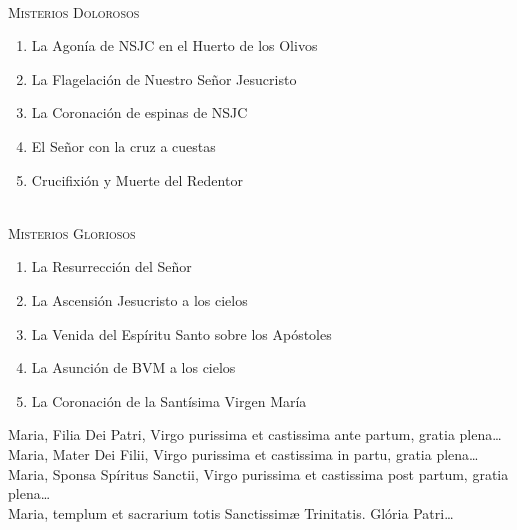 \documentclass[9pt]{article}
\begin{document}
\begin{multicols*}{2}
    \small{}\\
    \textsc{Misterios Dolorosos}
    \begin{enumerate}
        \item La Agonía de NSJC en el Huerto de los Olivos
        \item La Flagelación de Nuestro Señor Jesucristo
        \item La Coronación de espinas de NSJC
        \item El Señor con la cruz a cuestas
        \item Crucifixión y Muerte del Redentor
    \end{enumerate}

    \small{}\\
    \textsc{Misterios Gloriosos}
    \begin{enumerate}
        \item La Resurrección del Señor
        \item La Ascensión Jesucristo a los cielos
        \item La Venida del Espíritu Santo sobre los Apóstoles
        \item La Asunción de BVM a los cielos
        \item La Coronación de la Santísima Virgen María
    \end{enumerate}

    \bigskip

     Maria, Filia Dei Patri, Virgo purissima et castissima ante partum, gratia plena{\ldots}\\
     Maria, Mater Dei Filii, Virgo purissima et castissima in partu, gratia plena{\ldots}\\
     Maria, Sponsa Spíritus Sanctii, Virgo purissima et castissima post partum, gratia plena{\ldots}\\
     Maria, templum et sacrarium totis Sanctissim{\ae} Trinitatis. Glória Patri{\ldots}\\


\end{multicols*}
\end{document}
